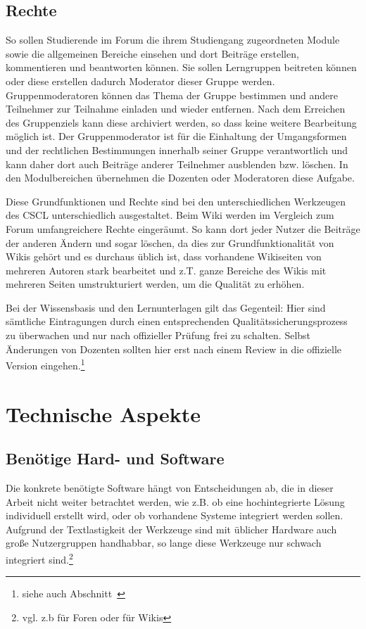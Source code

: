 \subsection{Rechte} %
\label{sub:rechte}
So sollen Studierende im Forum die ihrem Studiengang zugeordneten Module sowie die allgemeinen Bereiche einsehen und dort Beiträge erstellen, kommentieren und beantworten können. Sie sollen Lerngruppen beitreten können oder diese erstellen dadurch Moderator dieser Gruppe werden. Gruppenmoderatoren können das Thema der Gruppe bestimmen und andere Teilnehmer zur Teilnahme einladen und wieder entfernen. Nach dem Erreichen des Gruppenziels kann diese archiviert werden, so dass keine weitere Bearbeitung möglich ist. Der Gruppenmoderator ist für die Einhaltung der Umgangsformen und der rechtlichen Bestimmungen innerhalb seiner Gruppe verantwortlich und kann daher dort auch Beiträge anderer Teilnehmer ausblenden bzw. löschen. In den Modulbereichen übernehmen die Dozenten oder Moderatoren diese Aufgabe.

Diese Grundfunktionen und Rechte sind bei den unterschiedlichen Werkzeugen des \ac{CSCL} unterschiedlich ausgestaltet. Beim Wiki werden im Vergleich zum Forum umfangreichere Rechte eingeräumt. So kann dort jeder Nutzer die Beiträge der anderen Ändern und sogar löschen, da dies zur Grundfunktionalität von Wikis gehört und es durchaus üblich ist, dass vorhandene Wikiseiten von mehreren Autoren stark bearbeitet und z.T. ganze Bereiche des Wikis mit mehreren Seiten umstrukturiert werden, um die Qualität zu erhöhen. 

Bei der Wissensbasis und den Lernunterlagen gilt das Gegenteil: Hier sind sämtliche Eintragungen durch einen entsprechenden Qualitätssicherungsprozess zu überwachen und nur nach offizieller Prüfung frei zu schalten. Selbst Änderungen von Dozenten sollten hier erst nach einem Review in die offizielle Version eingehen.\footnote{siehe auch Abschnitt~}


\newpage
\section{Technische Aspekte} %
\label{sec:technische_und_wirtschaftliche_aspekte}

\subsection{Benötige Hard- und Software} %
\label{sub:benotige_hard_und_software}
Die konkrete benötigte Software hängt von Entscheidungen ab, die in dieser Arbeit nicht weiter betrachtet werden, wie z.B. ob eine hochintegrierte Lösung individuell erstellt wird, oder ob vorhandene Systeme integriert werden sollen. Aufgrund der Textlastigkeit der Werkzeuge sind mit üblicher Hardware auch große Nutzergruppen handhabbar, so lange diese Werkzeuge nur schwach integriert sind.\footnote{vgl. z.b \cite{phpbblarge} für Foren oder \cite{dwlarge} für Wikis}

